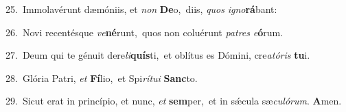 {\numbfont\textcolor{\numbcolor}{25.}}~Immolavérunt dæmóniis, et \textit{non} \textbf{De}\-o,~\star diis, \textit{quos} \textit{i}\-\textit{gno}\textbf{rá}bant:\par
{\numbfont\textcolor{\numbcolor}{26.}}~Novi recentésque \textit{ve}\-\textbf{né}runt,~\star quos non coluérunt \textit{pa}\-\textit{tres} \textit{e}\-\textbf{ó}rum.\par
{\numbfont\textcolor{\numbcolor}{27.}}~Deum qui te génuit dere\-\textit{li}\-\textbf{quís}ti,~\star et oblítus es Dómini, cre\-\textit{a}\-\textit{tó}\textit{ris} \textbf{tu}\-i.\par
{\numbfont\textcolor{\numbcolor}{28.}}~Glória Patri, \textit{et} \textbf{Fí}\-lio,~\star et Spi\-\textit{rí}\-\textit{tu}\textit{i} \textbf{Sanc}\-to.\par
{\numbfont\textcolor{\numbcolor}{29.}}~Sicut erat in princípio, et nunc, \textit{et} \textbf{sem}\-per,~\star et in sǽcula sæ\-\textit{cu}\-\textit{ló}\textit{rum}. \textbf{A}\-men.\par
